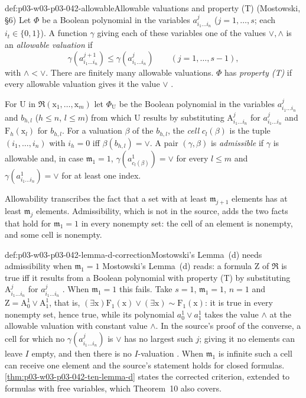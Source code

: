 \begin{hbdefinition}{def:p03-w03-p03-042-allowable}{Allowable valuations and property (T) (Mostowski, \S6)}
Let \(\Phi\) be a Boolean polynomial in the variables \(a^j_{i_1\ldots
i_n}\) (\(j=1,\ldots,s\); each \(i_t\in\{0,1\}\)).  A function
\(\gamma\) giving each of these variables one of the values \(\vee,\wedge\)
is an \emph{allowable valuation} if
\[
 \gamma(a^{j+1}_{i_1\ldots i_n})\leq\gamma(a^j_{i_1\ldots i_n})
 \qquad(j=1,\ldots,s-1),
\]
with \(\wedge<\vee\).  There are finitely many allowable valuations.
\(\Phi\) has \emph{property (T)} if every allowable valuation gives it the
value \(\vee\) \cite[p.~31]{Mostowski1957}.

For \(\mathrm U\) in \(\mathfrak R(\mathrm x_1,\ldots,\mathrm x_m)\) let
\(\Phi_{\mathrm U}\) be the Boolean polynomial in the variables
\(a^j_{i_1\ldots i_n}\) and \(b_{h,l}\) (\(h\leq n\), \(l\leq m\)) from
which \(\mathrm U\) results by substituting \(\mathrm A^j_{i_1\ldots
i_n}\) for \(a^j_{i_1\ldots i_n}\) and \(\mathrm F_h(\mathrm x_l)\) for
\(b_{h,l}\).  For a valuation \(\beta\) of the \(b_{h,l}\), the
\emph{cell} \(c_l(\beta)\) is the tuple \((i_1,\ldots,i_n)\) with
\(i_h=0\) iff \(\beta(b_{h,l})=\vee\).  A pair \((\gamma,\beta)\) is
\emph{admissible} if \(\gamma\) is allowable and, in case
\(\mathfrak m_1=1\), \(\gamma(a^1_{c_l(\beta)})=\vee\) for every \(l\leq
m\) and \(\gamma(a^1_{i_1\ldots i_n})=\vee\) for at least one index.
\end{hbdefinition}

Allowability transcribes the fact that a set with at least
\(\mathfrak m_{j+1}\) elements has at least \(\mathfrak m_j\) elements.
Admissibility, which is not in the source, adds the two facts that hold
for \(\mathfrak m_1=1\) in every nonempty set: the cell of an element is
nonempty, and some cell is nonempty.

\begin{hbwarning}{def:p03-w03-p03-042-lemma-d-correction}{Mostowski's Lemma~(d) needs admissibility when \(\mathfrak m_1=1\)}
Mostowski's Lemma~(d) reads: a formula \(\mathrm Z\) of \(\mathfrak R\)
is true iff it results from a Boolean polynomial with property (T) by
substituting \(\mathrm A^j_{i_1\ldots i_n}\) for \(a^j_{i_1\ldots i_n}\)
\cite[p.~31]{Mostowski1957}.  When \(\mathfrak m_1=1\) this fails.  Take
\(s=1\), \(\mathfrak m_1=1\), \(n=1\) and \(\mathrm Z=\mathrm A^1_0\vee
\mathrm A^1_1\), that is, \((\exists\mathrm x)\mathrm F_1(\mathrm x)\vee
(\exists\mathrm x){\sim}\mathrm F_1(\mathrm x)\): it is true in every
nonempty set, hence true, while its polynomial \(a^1_0\vee a^1_1\) takes
the value \(\wedge\) at the allowable valuation with constant value
\(\wedge\).  In the source's proof of the converse, a cell for which no
\(\gamma(a^j_{i_1\ldots i_n})\) is \(\vee\) has no largest such \(j\);
giving it no elements can leave \(I\) empty, and then there is no
\(I\)-valuation \cite[p.~31]{Mostowski1957}.  When \(\mathfrak m_1\) is
infinite such a cell can receive one element and the source's statement
holds for closed formulas.
\cref{thm:p03-w03-p03-042-ten-lemma-d} states the corrected criterion,
extended to formulas with free variables, which Theorem~10 also covers.
\end{hbwarning}

